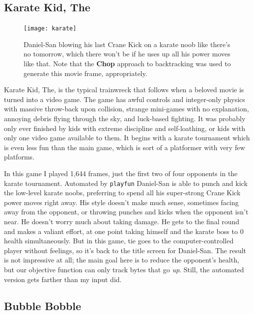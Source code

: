 \documentclass[twocolumn]{article}
\begin{document}
\subsection{Karate Kid, The} \label{sec:karate}

\begin{figure}[htb]
\begin{center}
\texttt{[image: karate]}
\end{center}\vspace{-0.1in}
\caption{
  Daniel-San blowing his last Crane Kick on a karate noob like there's
  no tomorrow, which there won't be if he uses up all his power moves
  like that. Note that the {\bf Chop} approach to backtracking was
  used to generate this movie frame, appropriately.}
\label{fig:karate}
\end{figure}

Karate Kid, The, is the typical trainwreck that follows when a beloved
movie is turned into a video game. The game has awful controls and
integer-only physics with massive throw-back upon collision, strange
mini-games with no explanation, annoying debris flying through the
sky, and luck-based fighting. It was probably only ever finished by
kids with extreme discipline and self-loathing, or kids with only one
video game available to them. It begins with a karate tournament which
is even less fun than the main game, which is sort of a platformer
with very few platforms.

In this game I played 1,644 frames, just the first two of four
opponents in the karate tournament. Automated by {\tt playfun}
Daniel-San is able to punch and kick the low-level karate noobs,
preferring to spend all his super-strong Crane Kick power moves right
away. His style doesn't make much sense, sometimes facing away from
the opponent, or throwing punches and kicks when the opponent isn't
near. He doesn't worry much about taking damage. He gets to the final
round and makes a valiant effort, at one point taking himself and the
karate boss to 0 health simultaneously. But in this game, tie goes to
the computer-controlled player without feelings, so it's back to the
title screen for Daniel-San. The result is not impressive at all; the
main goal here is to reduce the opponent's health, but our objective
function can only track bytes that go {\em up}. Still, the automated
version gets farther than my input did.

\subsection{Bubble Bobble} \label{sec:bubblebobble}
\end{document}
